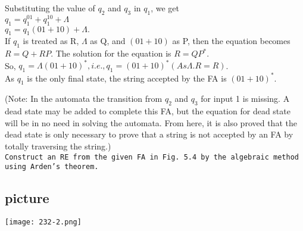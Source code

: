 \documentclass[9pt]{beamer}
\begin{document}
\begin{frame}
\hspace*{0.3cm} Substituting the value of $q_2$ and $q_3$ in $q_1$, we get\\

\vspace*{0.1cm}
\hspace*{4cm} $q_1 = q_1^01 + q_1^10 + \Lambda$ \\
\hspace*{4cm} $q_1 = q_1(01 + 10) + \Lambda.$ \\

\vspace*{0.1cm}
If $q_1$ is treated as R, $\Lambda$ as Q, and $(01 + 10)$ as P, then the equation becomes $R = Q + RP$.
The solution for the equation is $R = QP^*$.\\

\vspace*{0.1cm}
So, \hspace*{1.5cm}  $q_1 = \Lambda(01 + 10)^*, i.e., q_1 = (01 + 10)^* (As \Lambda.R = R)$.\\

\vspace*{0.1cm}
\hspace*{0.5cm} As $q_1$ is the only final state, the string accepted by the FA is $(01 + 10)^*$.\\
\end{frame}

\begin{frame}
\hspace*{0.5cm}(Note: In the automata the transition from $q_2$ and $q_3$ for input 1 is missing. A dead state may be added
to complete this FA, but the equation for dead state will be in no need in solving the automata. From
here, it is also proved that the dead state is only necessary to prove that a string is not accepted by an FA
by totally traversing the string.)\\

\vspace*{0.2cm}
\hspace*{0.1cm} \texttt{\small{Construct an RE from the given FA in Fig. 5.4 by the algebraic method using Arden’s theorem.}} \\

\vspace*{0.1cm}
\begin{center}
\section{picture}
\texttt{[image: 232-2.png]}
\end{center}

\end{frame}
\end{document}
